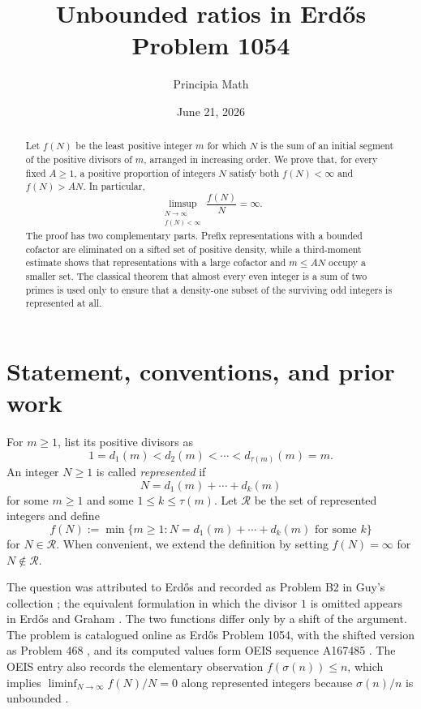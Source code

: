 \documentclass[11pt]{article}
\title{Unbounded ratios in Erd\H{o}s Problem 1054}
\author{Principia Math}
\date{June 21, 2026}
\theoremstyle{definition}
\theoremstyle{remark}
\newcommand{\Rset}{\mathscr R}
\begin{document}
\maketitle

\begin{abstract}
Let $f(N)$ be the least positive integer $m$ for which $N$ is the sum of an initial segment of the positive divisors of $m$, arranged in increasing order.  We prove that, for every fixed $A\geq 1$, a positive proportion of integers $N$ satisfy both $f(N)<\infty$ and $f(N)>AN$.  In particular,
\[
\limsup_{\substack{N\to\infty\\ f(N)<\infty}}\frac{f(N)}{N}=\infty.
\]
The proof has two complementary parts.  Prefix representations with a bounded cofactor are eliminated on a sifted set of positive density, while a third-moment estimate shows that representations with a large cofactor and $m\leq AN$ occupy a smaller set.  The classical theorem that almost every even integer is a sum of two primes is used only to ensure that a density-one subset of the surviving odd integers is represented at all.
\end{abstract}

\section{Statement, conventions, and prior work}

For $m\geq 1$, list its positive divisors as
\[
1=d_1(m)<d_2(m)<\cdots<d_{\tau(m)}(m)=m.
\]
An integer $N\geq 1$ is called \emph{represented} if
\[
N=d_1(m)+\cdots+d_k(m)
\]
for some $m\geq 1$ and some $1\leq k\leq \tau(m)$.  Let $\Rset$ be the set of represented integers and define
\[
f(N):=\min\bigl\{m\geq 1:N=d_1(m)+\cdots+d_k(m)
\text{ for some }k\bigr\}
\]
for $N\in\Rset$.  When convenient, we extend the definition by setting $f(N)=\infty$ for $N\notin\Rset$.

The question was attributed to Erd\H{o}s and recorded as Problem B2 in Guy's collection \cite{Guy}; the equivalent formulation in which the divisor $1$ is omitted appears in Erd\H{o}s and Graham \cite[p.~93]{ErdosGraham}.  The two functions differ only by a shift of the argument.  The problem is catalogued online as Erd\H{o}s Problem 1054, with the shifted version as Problem 468 \cite{Bloom1054,Bloom468}, and its computed values form OEIS sequence A167485 \cite{OEIS}.
The OEIS entry also records the elementary observation $f(\sigma(n))\leq n$, which implies $\liminf_{N\to\infty}f(N)/N=0$ along represented integers because $\sigma(n)/n$ is unbounded \cite{OEIS}.
\end{document}
